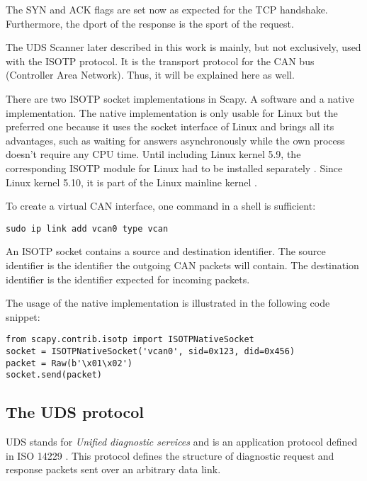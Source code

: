 The SYN and ACK flags are set now as expected for the TCP handshake. Furthermore, the dport of the response is the sport of the request.

The UDS Scanner later described in this work is mainly, but not exclusively, used with the ISOTP protocol. It is the transport protocol for the CAN bus (Controller Area Network). Thus, it will be explained here as well.

There are two ISOTP socket implementations in Scapy. A software and a native implementation. The native implementation is only usable for Linux but the preferred one because it uses the socket interface of Linux and brings all its advantages, such as waiting for answers asynchronously while the own process doesn't require any CPU time. Until including Linux kernel 5.9, the corresponding ISOTP module for Linux had to be installed separately \cite{isotp-module}. Since Linux kernel 5.10, it is part of the Linux mainline kernel \cite{isotp-commit}.

To create a virtual CAN interface, one command in a shell is sufficient:
\begin{samepage}
\begin{verbatim}
sudo ip link add vcan0 type vcan
\end{verbatim}
\end{samepage}

An ISOTP socket contains a source and destination identifier. The source identifier is the identifier the outgoing CAN packets will contain. The destination identifier is the identifier expected for incoming packets.

The usage of the native implementation is illustrated in the following code snippet:

\begin{samepage}
\begin{verbatim}
from scapy.contrib.isotp import ISOTPNativeSocket
socket = ISOTPNativeSocket('vcan0', sid=0x123, did=0x456)
packet = Raw(b'\x01\x02')
socket.send(packet)
\end{verbatim}
\end{samepage}


\subsection{The UDS protocol}

UDS stands for \emph{Unified diagnostic services} and is an application protocol defined in ISO 14229 \cite{iso14229}. This protocol defines the structure of diagnostic request and response packets sent over an arbitrary data link.

